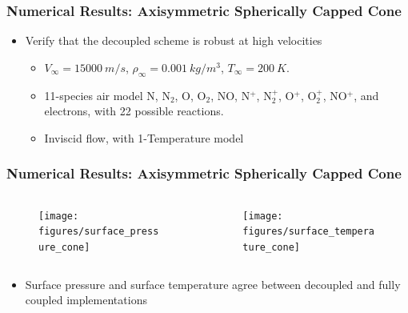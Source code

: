 \documentclass{beamer}
\begin{document}
\begin{frame}
  \frametitle{Numerical Results: Axisymmetric Spherically Capped Cone}
  \begin{figure}[h]
  	\centering
  \end{figure}
  \begin{itemize}
    \item Verify that the decoupled scheme is robust at high velocities
    \begin{itemize}
      \item $V_{\infty} = 15000\ m/s$, $\rho_{\infty}=0.001\ kg/m^3$, 
        $T_\infty = 200\ K$.
      \item 11-species air model N, $\text{N}_2$, O,
        $\text{O}_2$, NO, N$^+$, $\text{N}_2^+$, O$^+$, 
        $\text{O}_2^+$, NO$^+$, and electrons, with 22 possible reactions.
      \item Inviscid flow, with 1-Temperature model
    \end{itemize}
  \end{itemize}
\end{frame}
\begin{frame}
  \frametitle{Numerical Results: Axisymmetric Spherically Capped Cone}
    \begin{columns}[t]
      \begin{column}{0.5\textwidth}
        \begin{figure}[h!]
          \texttt{[image: figures/surface\_pressure\_cone]}
        \end{figure}
      \end{column}
      \begin{column}{0.5\textwidth}
        \begin{figure}[h!]
          \texttt{[image: figures/surface\_temperature\_cone]}
        \end{figure}
      \end{column}
    \end{columns}
    \begin{itemize}
      \item Surface pressure and surface temperature agree between decoupled and
        fully coupled implementations
    \end{itemize}
\end{frame}
\end{document}
